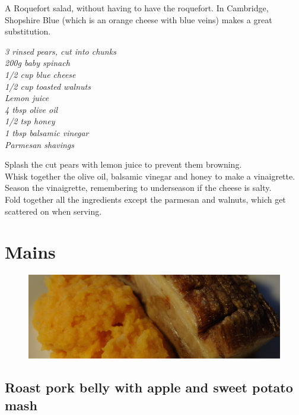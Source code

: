 \documentclass{tufte-book}
\begin{document}
A Roquefort salad, without having to have the roquefort. In Cambridge, Shopshire Blue (which is an orange cheese with blue veins) makes a great substitution.

\smallskip
\emph{3 rinsed pears, cut into chunks
\\200g baby spinach
\\1/2 cup blue cheese
\\1/2 cup toasted walnuts
\\Lemon juice
\\4 tbsp olive oil
\\1/2 tsp honey
\\1 tbsp balsamic vinegar
\\Parmesan shavings
}

\smallskip
Splash the cut pears with lemon juice to prevent them browning.
\\Whisk together the olive oil, balsamic vinegar and honey to make a vinaigrette.
\\Season the vinaigrette, remembering to underseason if the cheese is salty.
\\Fold together all the ingredients except the parmesan and walnuts, which get scattered on when serving.

\chapter{Mains}

\begin{figure}[h]
  \includegraphics[width=\linewidth]{bellyporkwide.png}
\end{figure}

\section{Roast pork belly with apple and sweet potato mash}
\end{document}

